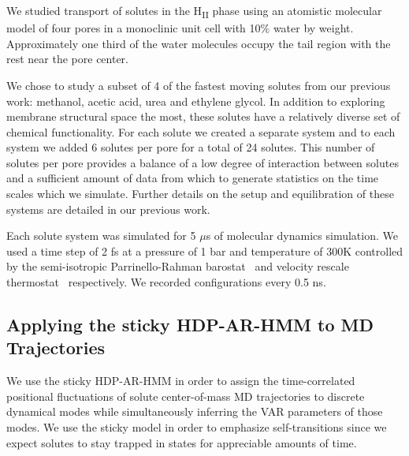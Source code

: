 \documentclass[journal=jpcbfk,manuscript=article]{achemso}
\begin{document}
  We studied transport of solutes in the H\textsubscript{II} phase using an
  atomistic molecular model of four pores in a monoclinic unit cell with 
  10\% water by weight. Approximately one third of the water molecules 
  occupy the tail region with the rest near the pore center.%
  
  We chose to study a subset of 4 of the fastest moving solutes from our previous
  work: methanol, acetic acid, urea and ethylene glycol.
  In addition to exploring membrane structural space the most, these solutes have a
  relatively diverse set of chemical functionality. For each solute we created a 
  separate system and to each system we added 6 solutes per pore for a total of 24 solutes. This number 
  of solutes per pore provides a balance of a low degree of interaction between 
  solutes and a sufficient amount of data from which to generate statistics on the
  time scales which we simulate. Further details on the setup and equilibration of
  these systems are detailed in our previous work.\cite{coscia_chemically_2019}
  
  Each solute system was simulated for 5 $\mu$s of molecular dynamics simulation. We
  used a time step of 2 fs at a pressure of 1 bar and temperature of 300K controlled
  by the semi-isotropic Parrinello-Rahman 
  barostat~\cite{parrinello_polymorphic_1981} and velocity rescale 
  thermostat~\cite{bussi_canonical_2007} respectively. We recorded configurations every 0.5 ns.

  \subsection{Applying the sticky HDP-AR-HMM to MD Trajectories}\label{method:HDP-AR-HMM}

  We use the sticky HDP-AR-HMM in order to assign the time-correlated positional 
  fluctuations of solute center-of-mass MD trajectories to discrete dynamical modes while 
  simultaneously inferring the VAR parameters of those modes. We use the sticky model
  in order to emphasize self-transitions since we expect solutes to stay trapped in
  states for appreciable amounts of time. 
  
\end{document}
